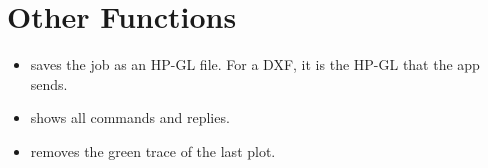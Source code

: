 \section{Other Functions}

\begin{itemize}
  \item {} saves the job as an HP-GL file. For a
        DXF, it is the HP-GL that the app sends.
  \item {} shows all commands and replies.
  \item {} removes the green trace of the last plot.
\end{itemize}

